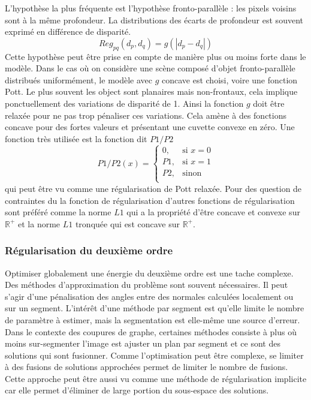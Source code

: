 \documentclass[../main/These_Mathias_Paget.tex]{subfiles}
\begin{document}
L'hypothèse la plus fréquente est l'hypothèse fronto-parallèle : les pixels voisins sont à la même profondeur. La distributions des écarts de profondeur est souvent exprimé en différence de disparité.
\begin{equation}
Reg_{pq}(d_p,d_q) =  g(|d_p - d_q|)
\end{equation}
Cette hypothèse peut être prise en compte de manière plus ou moins forte dans le modèle. Dans le cas où on considère une scène composé d'objet fronto-parallèle distribués uniformément, le modèle avec $g$ concave est choisi, voire une fonction Pott. Le plus souvent les object sont planaires mais non-frontaux, cela implique ponctuellement des variations de disparité de 1. Ainsi la fonction $g$ doit être relaxée pour ne pas trop pénaliser ces variations. Cela amène à des fonctions concave pour des fortes valeurs et présentant une cuvette convexe en zéro. Une fonction très utilisée est la fonction dit $P1/P2$
\begin{equation}
P1/P2(x) = \left\{
		\begin{aligned}
			 0, & \text{si } x=0 \\
			 P1, & \text{si } x=1 \\
			 P2, & \text{sinon} \\
		\end{aligned}
		\right.
\end{equation}
qui peut être vu comme une régularisation de Pott relaxée. Pour des question de contraintes du la fonction de régularisation d'autres fonctions de régularisation sont préféré comme la norme $L1$ qui a la propriété d'être concave et convexe sur $\mathbb{R}^+$ et la norme $L1$ tronquée qui est concave sur $\mathbb{R}^+$.

\subsubsection{Régularisation du deuxième ordre}

Optimiser globalement une énergie du deuxième ordre est une tache complexe. Des méthodes d'approximation du problème sont souvent nécessaires. Il peut s'agir d'une pénalisation des angles entre des normales calculées localement ou sur un segment. L’intérêt d'une méthode par segment est qu'elle limite le nombre de paramètre à estimer, mais la segmentation est elle-même une source d'erreur. Dans le contexte des coupures de graphe, certaines méthodes consiste à plus où moins sur-segmenter l’image est ajuster un plan par segment et ce sont des solutions qui sont fusionner. Comme l'optimisation peut être complexe, se limiter à des fusions de solutions approchées permet de limiter le nombre de fusions. Cette approche peut être aussi vu comme une méthode de régularisation implicite car elle permet d’éliminer de large portion du sous-espace des solutions.
\end{document}
